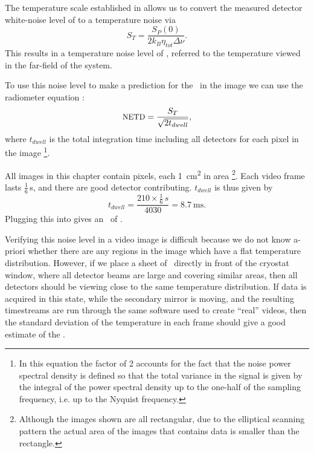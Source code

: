 The temperature scale established in  allows us to convert the measured detector white-noise level of  to a temperature noise via
\begin{equation}
  S_T = \frac{S_P(0)}{2 k_B \eta_{tot} \Delta \nu}.
\end{equation}
This results in a temperature noise level of , referred to the temperature viewed in the far-field of the system.

To use this noise level to make a prediction for the \NETD\ in the image we can use the radiometer equation \cite{kraus_radio_1986}:
\begin{equation} \label{eqn:ch8-radiometer}
  \text{{\small NETD}} = \frac{S_T}{\sqrt{2 t_{dwell}}},
\end{equation}
where $t_{dwell}$ is the total integration time including all detectors for each pixel in the image%
\footnote{%
In this equation the factor of 2 accounts for the fact that the noise power spectral density is defined so that the total variance in the signal is given by the integral of the power spectral density up to the one-half of the sampling frequency, i.e. up to the Nyquist frequency.
}.

All images in this chapter contain  pixels, each \SI{1}{\cm^2} in area%
\footnote{
  Although the images shown are all rectangular, due to the elliptical scanning pattern the actual area of the images that contains data is smaller than the rectangle.
}.
Each video frame lasts $\frac{1}{6}$\,\si{\s}, and there are  good detector contributing.
$t_{dwell}$ is thus given by
\begin{equation} \label{eqn:ch8-t-dwell}
  t_{dwell} = \frac{210 \times \frac{1}{6}\,\si{s}}{4030} = \SI{8.7}{\ms}.
\end{equation}
Plugging this into  gives an \NETD\ of .

Verifying this noise level in a video image is difficult because we do not know a-priori whether there are any regions in the image which have a flat temperature distribution.
However, if we place a sheet of \ecco\ directly in front of the cryostat window, where all detector beams are large and covering similar areas, then all detectors should be viewing close to the same temperature distribution.
If data is acquired in this state, while the secondary mirror is moving, and the resulting timestreams are run through the same software used to create ``real'' videos, then the standard deviation of the temperature in each frame should give a good estimate of the \NETD.

